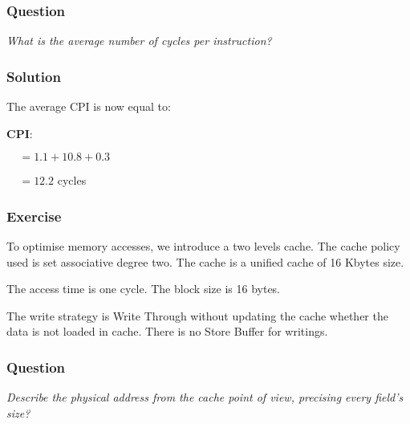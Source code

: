 
\begin{frame}
  \frametitle{Question}

  \textit{What is the average number of cycles per instruction?}
\end{frame}


\begin{frame}
  \frametitle{Solution}

  The average CPI is now equal to:

  \-

  \textbf{CPI}:

  $~~~~~= 1.1 + 10.8 + 0.3$

  $~~~~~= 12.2$ cycles
\end{frame}


\begin{frame}
  \frametitle{Exercise}

  To optimise memory accesses, we introduce a two levels cache. The
  cache policy used is set associative degree two. The cache is a
  unified cache of 16 Kbytes size.

  \-

  The access time is one cycle. The block size is 16 bytes.

  \-

  The write strategy is Write Through without updating the cache whether
  the data is not loaded in cache. There is no Store Buffer for writings.
\end{frame}


\begin{frame}
  \frametitle{Question}

  \textit{Describe the physical address from the cache point of view,
    precising every field's size?}
\end{frame}


